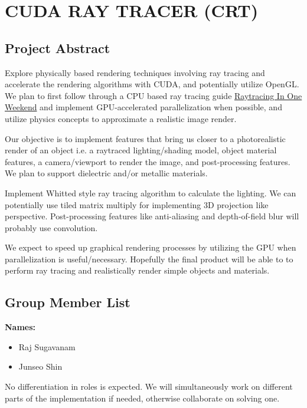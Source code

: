 \documentclass[12pt]{article}
\begin{document}
{\section*{CUDA RAY TRACER (CRT)}}

{\subsection*{Project Abstract}}

Explore physically based rendering techniques involving ray tracing and accelerate the
rendering algorithms with CUDA, and potentially utilize OpenGL. We plan to first follow through a
CPU based ray tracing guide \href{https://raytracing.github.io/books/RayTracingInOneWeekend.html}{Raytracing In One Weekend}
and implement GPU-accelerated parallelization when possible, and utilize physics concepts to
approximate a realistic image render.

Our objective is to implement features that bring us closer to a photorealistic render of an object
i.e. a raytraced lighting/shading model, object material features, a camera/viewport to render the
image, and post-processing features. We plan to support dielectric and/or metallic materials.

Implement Whitted style ray tracing algorithm to calculate the lighting.
We can potentially use tiled matrix multiply for implementing 3D projection like perspective.
Post-processing features like anti-aliasing and depth-of-field blur will probably use convolution.

We expect to speed up graphical rendering processes by utilizing the GPU when parallelization is
useful/necessary. Hopefully the final product will be able to to perform ray tracing and
realistically render simple objects and materials.

{\subsection*{Group Member List}}

\textbf{Names:}
\begin{itemize}
    \item Raj Sugavanam
    \item Junseo Shin
\end{itemize}

No differentiation in roles is expected. We will simultaneously work on
different parts of the implementation if needed, otherwise collaborate on
solving one.
\end{document}

